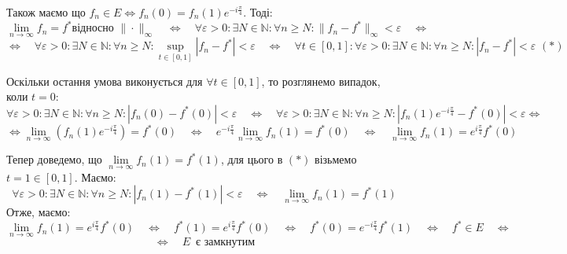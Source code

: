 \documentclass[a5paper, 20pt, titlepage]{article}
\begin{document}
\begin{enumerate}
\vspace{-2mm}
Також маємо що $f_n \in E \Leftrightarrow{} f_n(0) = f_n(1) e^{-i \frac{\pi}{4}}$. Тоді:
\vspace{-2mm}
$$\lim \limits_{n \to \infty} f_n = f^* \text{відносно $\| \cdot \|_\infty$} \quad \Leftrightarrow{} \quad \forall \varepsilon >0: \exists N \in \mathbb{N}: \forall n \geqslant N: \| f_n - f^* \|_\infty < \varepsilon \quad \Leftrightarrow $$
\vspace{-6mm}
$$\Leftrightarrow{} \quad \forall \varepsilon >0: \exists N \in \mathbb{N}: \forall n \geqslant N: \sup \limits_{t \in [0, 1]}|f_n - f^* | < \varepsilon \quad
\Leftrightarrow{} \quad  \forall t \in [0, 1]: \forall \varepsilon >0: \exists N \in \mathbb{N}: \forall n \geqslant N: |f_n - f^* | < \varepsilon \,\, (*)$$

Оскільки остання умова виконується для  $\forall t \in [0, 1]$, то розглянемо випадок, коли $t = 0$:
\vspace{-3mm}
$$\forall \varepsilon >0: \exists N \in \mathbb{N}: \forall n \geqslant N: |f_n(0) - f^*(0)| < \varepsilon \quad \Leftrightarrow{} \quad
\forall \varepsilon >0: \exists N \in \mathbb{N}: \forall n \geqslant N: |f_n(1) e^{-i \frac{\pi}{4}} - f^*(0)| < \varepsilon \Leftrightarrow{}$$
\vspace{-8mm}
$$\Leftrightarrow{} \lim \limits_{n \to \infty} (f_n(1) e^{-i \frac{\pi}{4}}) = f^*(0) \quad \Leftrightarrow{} \quad e^{-i \frac{\pi}{4}} \lim \limits_{n \to \infty} f_n(1) = f^*(0) \quad \Leftrightarrow{} \quad  \lim \limits_{n \to \infty} f_n(1) =e^{i \frac{\pi}{4}}  f^*(0)  $$

\newpage{}

Тепер доведемо, що $\lim \limits_{n \to \infty} f_n(1) = f^*(1)$, для цього в $(*)$ візьмемо $t = 1 \in [0, 1]$. Маємо:
\vspace{-3mm}
$$\forall \varepsilon >0: \exists N \in \mathbb{N}: \forall n \geqslant N: |f_n(1) - f^*(1)| < \varepsilon \quad \Leftrightarrow{} \quad \lim \limits_{n \to \infty} f_n(1) = f^*(1)$$
\vspace{-3mm}
Отже, маємо:
\vspace{2mm}
$$ \lim \limits_{n \to \infty} f_n(1) = e^{i \frac{\pi}{4}}  f^*(0) \quad \Leftrightarrow{} \quad  f^*(1) = e^{i \frac{\pi}{4}}  f^*(0)  \quad \Leftrightarrow{} \quad f^*(0) =  e^{-i \frac{\pi}{4}} f^*(1) \quad \Leftrightarrow{} \quad f^* \in E \quad \Leftrightarrow{}$$
\vspace{-8mm}
$$ \Leftrightarrow{} \quad E \,\,\, \text{є замкнутим}$$
\end{enumerate}
\end{document}
